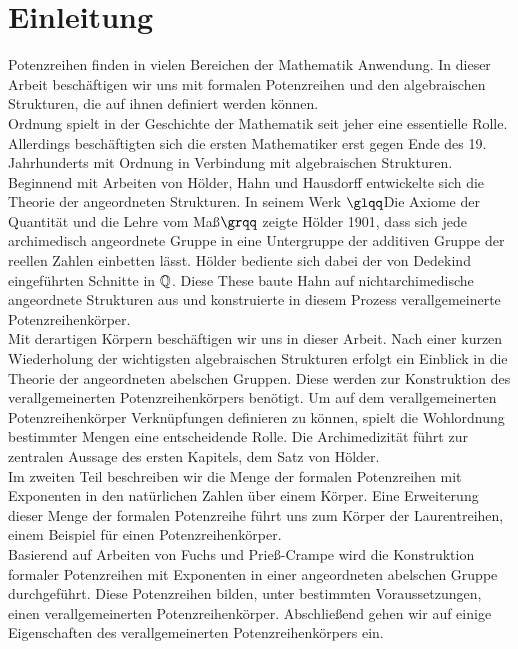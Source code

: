 \chapter{Einleitung}
%
Potenzreihen finden in vielen Bereichen der Mathematik Anwendung. In dieser Arbeit beschäftigen wir uns mit formalen Potenzreihen und den algebraischen Strukturen, die auf ihnen definiert werden können. \\
Ordnung spielt  in der Geschichte der Mathematik seit jeher eine essentielle Rolle. Allerdings beschäftigten sich die ersten Mathematiker erst gegen Ende des 19. Jahrhunderts mit Ordnung in Verbindung mit algebraischen Strukturen. Beginnend mit Arbeiten von Hölder, Hahn und Hausdorff entwickelte sich die Theorie der angeordneten Strukturen. In seinem Werk $\glqq$Die Axiome der Quantität und die Lehre vom Maß$\grqq$ zeigte Hölder 1901, dass sich jede archimedisch angeordnete Gruppe in eine Untergruppe der additiven Gruppe der reellen Zahlen einbetten lässt. Hölder bediente sich dabei der von Dedekind eingeführten Schnitte in $\mathbb{Q}$. Diese These baute Hahn auf nichtarchimedische angeordnete Strukturen aus und konstruierte in diesem Prozess verallgemeinerte Potenzreihenkörper.    \\
Mit derartigen Körpern beschäftigen wir uns in dieser Arbeit. Nach einer kurzen Wiederholung der wichtigsten algebraischen Strukturen erfolgt ein Einblick in die Theorie der angeordneten abelschen Gruppen. Diese werden zur Konstruktion des verallgemeinerten Potenzreihenkörpers benötigt. Um auf dem verallgemeinerten Potenzreihenkörper Verknüpfungen definieren zu können, spielt die Wohlordnung bestimmter Mengen eine entscheidende Rolle. Die Archimedizität führt zur zentralen Aussage des ersten Kapitels, dem Satz von Hölder. \\
Im zweiten Teil beschreiben wir die Menge der formalen Potenzreihen mit Exponenten in den natürlichen Zahlen über einem Körper. Eine Erweiterung dieser Menge der formalen Potenzreihe führt uns zum Körper der Laurentreihen, einem Beispiel für einen Potenzreihenkörper.\\
Basierend auf Arbeiten von Fuchs und Prieß-Crampe wird die Konstruktion formaler Potenzreihen mit Exponenten in einer angeordneten abelschen Gruppe durchgeführt. Diese Potenzreihen bilden, unter bestimmten Voraussetzungen, einen verallgemeinerten Potenzreihenkörper. Abschließend gehen wir auf einige Eigenschaften des verallgemeinerten Potenzreihenkörpers ein. 




%
%
%
